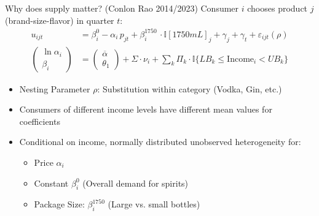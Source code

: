 \documentclass[aspectratio=169,10pt]{beamer}
\begin{document}
\begin{frame}{Why does supply matter? (Conlon Rao 2014/2023)}
Consumer $i$ chooses product $j$ (brand-size-flavor) in quarter $t$:
\begin{align*}
u_{ijt} &= \beta_{i}^0 -  \alpha_i\, p_{jt} + \beta_i^{1750}\, \cdot \mathbb{I}[1750mL]_j + \gamma_j + \gamma_t+ \varepsilon_{ijt}(\rho)\\
\begin{pmatrix}
\ln \alpha_i\\
\beta_i
\end{pmatrix} &=
\begin{pmatrix}
\overline{\alpha}\\
\theta_1
\end{pmatrix} + \Sigma \cdot \nu_i + \sum_{k} \Pi_k \cdot \mathbb{I}\{LB_k \leq \text{Income}_i < UB_k\} 
\end{align*}
\begin{itemize}
\item Nesting Parameter $\rho$: Substitution within category (Vodka, Gin, etc.) %
\item Consumers of different income levels have different mean values for coefficients
\item Conditional on income, normally distributed unobserved heterogeneity for:
\begin{itemize}
\item Price $\alpha_i$
\item Constant $\beta_{i}^0$ (Overall demand for spirits)
\item Package Size: $\beta_{i}^{1750}$ (Large vs. small bottles)
\end{itemize}
\end{itemize}
\end{frame}
\end{document}
